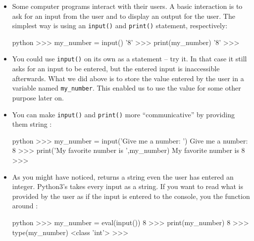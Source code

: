 \documentclass[a4paper]{article}
\begin{document}
\begin{itemize}

\item Some computer programs interact with their users. A basic interaction is
to ask for an input from the user and to display an output for the user. The
simplest way is using an \Verb+input()+ and \Verb+print()+ statement,
respectively:

\begin{ucodeframe}
\begin{pygments}[frame=none]{python}
>>> my_number = input()
'8'
>>> print(my_number)
'8'
>>> 
\end{pygments}
\end{ucodeframe}

\item You could use \Verb+input()+ on its own as a statement -- try it. In that
case it still asks for an input to be entered, but the entered input is
inaccessible afterwards. What we did above is to store the value entered by the
user in a variable named \Verb+my_number+. This enabled us to use the value for
some other purpose later on.

\item You can make \Verb+input()+ and \Verb+print()+ more ``communicative'' by
providing them string :

\begin{ucodeframe}
\begin{pygments}[frame=none]{python}
>>> my_number = input('Give me a number: ')
Give me a number: 8
>>> print('My favorite number is ',my_number)
My favorite number is  8
>>> 
\end{pygments}
\end{ucodeframe}


\item As you might have noticed,  returns a string even the user has
entered an integer. Python3's  takes every input as a string. If you
want  to read what is provided by the user as if the input is entered
to the console, you  the function  around :

\begin{ucodeframe}
\begin{pygments}[frame=none]{python}
>>> my_number = eval(input())
8
>>> print(my_number)
8
>>> type(my_number)
<class 'int'>
>>> 
\end{pygments}
\end{ucodeframe}
\end{itemize}
\end{document}
